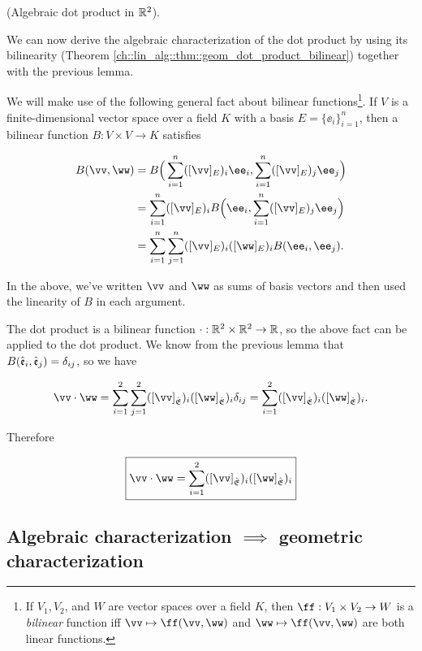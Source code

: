 \begin{deriv}
    (Algebraic dot product in $\mathbb{R}^2$). 
    
    We can now derive the algebraic characterization of the dot product by using its bilinearity (Theorem \ref{ch::lin_alg::thm::geom_dot_product_bilinear}) together with the previous lemma.
    
    We will make use of the following general fact about bilinear functions\footnote{If $V_1, V_2$, and $W$ are vector spaces over a field $K$, then $\ff:V_1 \times V_2 \rightarrow W$ is a \textit{bilinear} function iff $\vv \mapsto \ff(\vv, \ww)$ and $\ww \mapsto \ff(\vv, \ww)$ are both linear functions.}. If $V$ is a finite-dimensional vector space over a field $K$ with a basis $E = \{\ee_i\}_{i = 1}^n$, then a bilinear function $B:V \times V \rightarrow K$ satisfies
    
    \begin{align*}
        B(\vv, \ww) &= B\Big(\sum_{i = 1}^n ([\vv]_E)_i \ee_i, \sum_{i = 1}^n ([\vv]_E)_j \ee_j\Big) \\
        &= \sum_{i = 1}^n ([\vv]_E)_i B\Big(\ee_i, \sum_{i = 1}^n ([\vv]_E)_j \ee_j\Big) \\
        &= \sum_{i = 1}^n \sum_{j = 1}^n ([\vv]_E)_i ([\ww]_E)_i B(\ee_i, \ee_j).
    \end{align*}
    
    In the above, we've written $\vv$ and $\ww$ as sums of basis vectors and then used the linearity of $B$ in each argument.
    
    The dot product is a bilinear function $\cdot:\mathbb{R}^2 \times \mathbb{R}^2 \rightarrow \mathbb{R}$, so the above fact can be applied to the dot product. We know from the previous lemma that $B(\hat{\mathfrak{e}}_i, \hat{\mathfrak{e}}_j) = \delta_{ij}$, so we have
    
    \begin{align*}
        \vv \cdot \ww = \sum_{i = 1}^2 \sum_{j = 1}^2 ([\vv]_\sE)_i ([\ww]_\sE)_i \delta_{ij} = \sum_{i = 1}^2 ([\vv]_\sE)_i ([\ww]_\sE)_i.
    \end{align*}
    
    Therefore
    
    \begin{align*}
        \boxed
        {
            \vv \cdot \ww = \sum_{i = 1}^2 ([\vv]_\sE)_i ([\ww]_\sE)_i
        }
    \end{align*}
\end{deriv}

\subsection*{Algebraic characterization $\implies$ geometric characterization}

